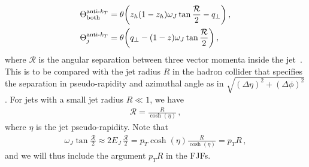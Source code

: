 \documentclass[a4paper, 11 pt]{article}
\begin{document}
\begin{align}
\Theta ^{\text{anti-}k_T}_{\textrm{both}}
& =
\theta \pqty{z_h (1 - z_h) \omega _J \tan{\frac{\mathcal{R}}{2}} - q_{\perp}}
\, , \\
\Theta ^{\text{anti-}k_T}_{j}
& =
\theta \pqty{q_{\perp} - (1 - z) \omega _J \tan\frac{\mathcal{R}}{2}}
\, , 
\end{align}
where $\mathcal{R}$ is the angular separation between three vector momenta inside the jet~\cite{Ellis:2010rwa}. This is to be compared with the jet radius $R$ in the hadron collider that specifies the separation in pseudo-rapidity and azimuthal angle as in $\sqrt{(\Delta\eta)^2+(\Delta \phi)^2}$. For jets with a small jet radius $R\ll 1$, we have
\begin{align}
\mathcal{R} = \frac{R}{\cosh(\eta)}\,,
\end{align}
where $\eta$ is the jet pseudo-rapidity. Note that
\begin{align}
    \omega_J \tan\frac{\mathcal{R}}{2} \approx  2 E_J \,\frac{\mathcal{R}}{2}
    = p_T\cosh(\eta) \frac{R}{\cosh(\eta)} = p_T R\,,
\end{align}
and we will thus include the argument $p_TR$ in the FJFs. 
\end{document}
